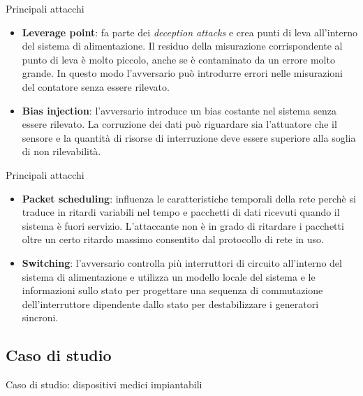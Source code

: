 \documentclass{beamer}
\begin{document}
\begin{frame}{Principali attacchi}
    \begin{itemize}
        \item \textbf{Leverage point}: fa parte dei \textit{deception attacks} e crea punti di leva all'interno del sistema di alimentazione. Il 
        residuo della misurazione corrispondente al punto di leva è molto piccolo, anche se è contaminato da un errore molto grande. In questo modo 
        l'avversario può introdurre errori nelle misurazioni del contatore senza essere rilevato. 
        \item \textbf{Bias injection}: l'avversario introduce un bias costante nel sistema senza essere rilevato. La corruzione dei dati può riguardare
        sia l'attuatore che il sensore e la quantità di risorse di interruzione deve essere superiore alla soglia di non rilevabilità.
    \end{itemize}
\end{frame}

\begin{frame}{Principali attacchi}
    \begin{itemize}
        \item \textbf{Packet scheduling}: influenza le caratteristiche temporali della rete perchè si traduce in ritardi variabili nel 
        tempo e pacchetti di dati ricevuti quando il sistema è fuori servizio. L'attaccante non è in grado di ritardare i pacchetti oltre un certo ritardo
        massimo consentito dal protocollo di rete in uso. 
        \item \textbf{Switching}: l'avversario controlla più interruttori di circuito all'interno del sistema di alimentazione e utilizza un modello locale
        del sistema e le informazioni sullo stato per progettare una sequenza di commutazione dell'interruttore dipendente dallo stato per destabilizzare 
        i generatori sincroni.
    \end{itemize}
\end{frame}




\subsection{Caso di studio}
\begin{frame}{Caso di studio: dispositivi medici impiantabili}
    
\end{frame}
\end{document}
